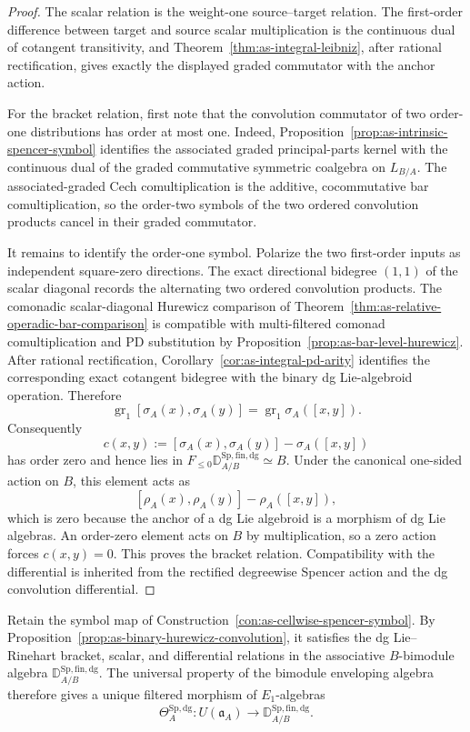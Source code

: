 \begin{proof}
The scalar relation is the weight-one source--target relation.  The
first-order difference between target and source scalar multiplication is the
continuous dual of cotangent transitivity, and
Theorem~\ref{thm:as-integral-leibniz}, after rational rectification, gives
exactly the displayed graded commutator with the anchor action.

For the bracket relation, first note that the convolution commutator of two
order-one distributions has order at most one.  Indeed,
Proposition~\ref{prop:as-intrinsic-spencer-symbol} identifies the associated
graded principal-parts kernel with the continuous dual of the graded
commutative symmetric coalgebra on $L_{B/A}$.  The associated-graded Cech
comultiplication is the additive, cocommutative bar comultiplication, so the
order-two symbols of the two ordered convolution products cancel in their
graded commutator.

It remains to identify the order-one symbol.  Polarize the two first-order
inputs as independent square-zero directions.  The exact directional
bidegree $(1,1)$ of the scalar diagonal records the alternating two ordered
convolution products.  The comonadic scalar-diagonal Hurewicz comparison of
Theorem~\ref{thm:as-relative-operadic-bar-comparison} is compatible with
multi-filtered comonad comultiplication and PD substitution by
Proposition~\ref{prop:as-bar-level-hurewicz}.  After rational rectification,
Corollary~\ref{cor:as-integral-pd-arity} identifies the corresponding exact
cotangent bidegree with the binary dg Lie-algebroid operation.  Therefore
\[
    \operatorname{gr}_1
    [\sigma_A(x),\sigma_A(y)]
    =
    \operatorname{gr}_1
    \sigma_A([x,y]).
\]
Consequently
\[
    c(x,y)
    :=
    [\sigma_A(x),\sigma_A(y)]
    -
    \sigma_A([x,y])
\]
has order zero and hence lies in
$F_{\le0}\mathbb D_{A/B}^{\mathrm{Sp,fin,dg}}\simeq B$.
Under the canonical one-sided action on $B$, this element acts as
\[
    [\rho_A(x),\rho_A(y)]-\rho_A([x,y]),
\]
which is zero because the anchor of a dg Lie algebroid is a morphism of dg Lie
algebras.  An order-zero element acts on $B$ by multiplication, so a zero
action forces $c(x,y)=0$.  This proves the bracket relation.  Compatibility
with the differential is inherited from the rectified degreewise Spencer
action and the dg convolution differential.
\end{proof}

\begin{construction}
\label{con:as-cellwise-pbw-map}
Retain the symbol map of
Construction~\ref{con:as-cellwise-spencer-symbol}.  By
Proposition~\ref{prop:as-binary-hurewicz-convolution}, it satisfies the dg
Lie--Rinehart bracket, scalar, and differential relations in the associative
$B$-bimodule algebra
$\mathbb D_{A/B}^{\mathrm{Sp,fin,dg}}$.  The universal property of the
bimodule enveloping algebra therefore gives a unique filtered morphism of
$E_1$-algebras
\[
\boxed{
    \Theta_A^{\mathrm{Sp,dg}}:
    U(\mathfrak a_A)
    \longrightarrow
    \mathbb D_{A/B}^{\mathrm{Sp,fin,dg}}.
}
\]
\end{construction}

